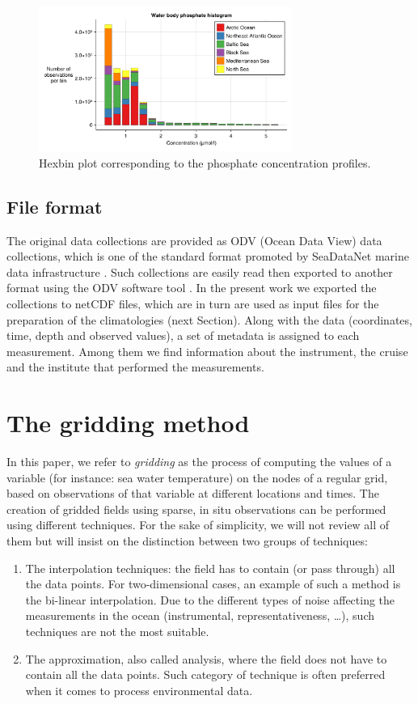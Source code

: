 \documentclass[essd, manuscript]{copernicus}
\begin{document}
\begin{figure}[t]
\includegraphics[width=8.3cm]{histogram_value_Water_body_phosphate.png}
\caption{Hexbin plot corresponding to the phosphate concentration profiles.\label{fig:histogram_value_Water_body_phosphate}}
\end{figure}


\subsection{File format}

The original data collections are provided as ODV (Ocean Data View) data collections, which is one of the standard format promoted by SeaDataNet marine data infrastructure \citep{Lowry2023}. Such collections are easily read then exported to another format using the ODV software tool \citep{SCHLITZER2002}. In the present work we exported the collections to netCDF files, which are in turn are used as input files for the preparation of the climatologies (next Section). Along with the data (coordinates, time, depth and observed values), a set of metadata is assigned to each measurement. Among them we find information about the instrument, the cruise and the institute that performed the measurements. 

\section{The gridding method\label{sec:method}}

In this paper, we refer to \textit{gridding} as the process of computing the values of a variable (for instance: sea water temperature) on the nodes of a regular grid, based on observations of that variable at different locations and times. The creation of gridded fields using sparse, in situ observations can be performed using different techniques. For the sake of simplicity, we will not review all of them but will insist on the distinction between two groups of techniques:
\begin{enumerate}
\item The interpolation techniques: the field has to contain (or pass through) all the data points. For two-dimensional cases, an example of such a method is the bi-linear interpolation. Due to the different types of noise affecting the measurements in the ocean (instrumental, representativeness, \ldots), such techniques are not the most suitable.
\item The approximation, also called analysis, where the field does not have to contain all the data points. Such category of technique is often preferred when it comes to process environmental data.
\end{enumerate}
\end{document}
